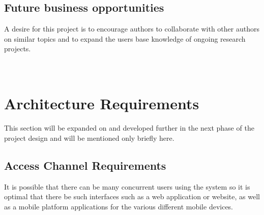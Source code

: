 \documentclass[a4paper]{article}
\begin{document}
	\subsection{Future business opportunities}
	A desire for this project is to encourage authors to collaborate with other authors on similar topics and to expand the users base knowledge of ongoing research projects.
	\\
	\\
	\\
	
	
	\section{Architecture Requirements}
	This section will be expanded on and developed further in the next phase of the project design and will be mentioned only briefly here.
	\\
	\subsection{Access Channel Requirements}
	It is possible that there can be many concurrent users using the system so it is optimal that there be such interfaces such as a web application or website, as well as a mobile platform applications for the various different mobile devices.
	\\
\end{document}
